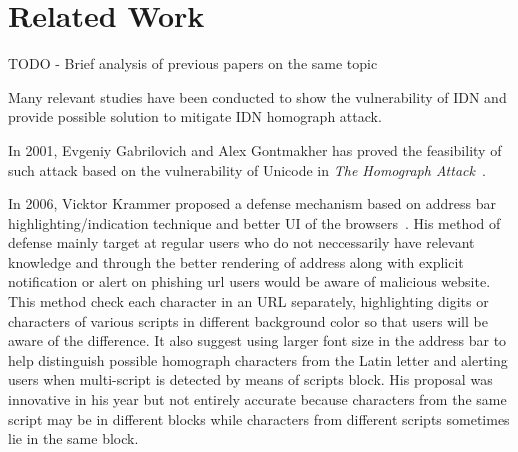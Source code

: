 \documentclass[letterpaper,twocolumn,10pt]{article}
\begin{document}
\section{Related Work}
TODO
- Brief analysis of previous papers on the same topic

Many relevant studies have been conducted to show the vulnerability of IDN and provide possible solution to mitigate IDN homograph attack.

In 2001, Evgeniy Gabrilovich and Alex Gontmakher has proved the feasibility of such attack based on the vulnerability of Unicode in \textit{The Homograph Attack}~\cite{theHomoAttack}.

In 2006, Vicktor Krammer proposed a defense mechanism based on address bar highlighting/indication technique and better UI of the browsers~\cite{phishdefenseKV}.
His method of defense mainly target at regular users who do not neccessarily have relevant knowledge and through the better rendering of address along with explicit notification or alert on phishing url users would be aware of malicious website.
This method check each character in an URL separately, highlighting digits or characters of various scripts in different background color so that users will be aware of the difference.
It also suggest using larger font size in the address bar to help distinguish possible homograph characters from the Latin letter and alerting users when multi-script is detected by means of scripts block.
His proposal was innovative in his year but not entirely accurate because characters from the same script may be in different blocks while characters from different scripts sometimes lie in the same block.
\end{document}

